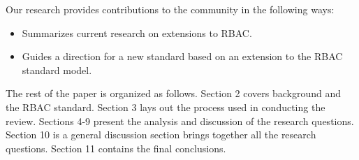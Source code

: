 Our research provides contributions to the community in the following ways:

\begin{itemize}
\setlength{\itemsep}{0.25pt}
\item Summarizes current research on extensions to RBAC.
\item Guides a direction for a new standard based on an extension to the RBAC standard model.
\end{itemize}

The rest of the paper is organized as follows. 
Section 2 covers background and the RBAC standard. 
Section 3 lays out the process used in conducting the review. 
Sections 4-9 present the analysis and discussion of the research questions. 
Section 10 is a general discussion section brings together all the research questions.
Section 11 contains the final conclusions.
